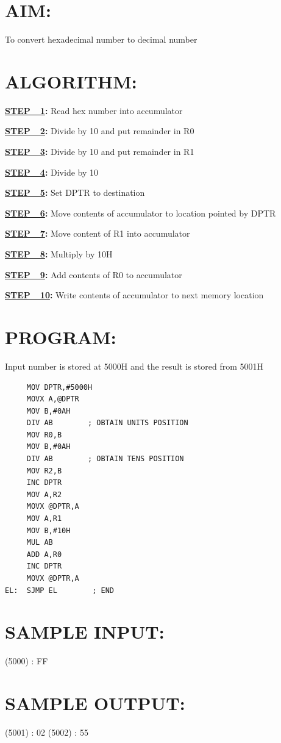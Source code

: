 \documentclass[a4paper,28pt,twoside,openright]{report}
\begin{document}
\section*{AIM:}
To convert hexadecimal number to decimal number

\section*{ALGORITHM:}
\textbf{\underline{STEP\ \ 1}:} Read hex number into accumulator

\textbf{\underline{STEP\ \ 2}:} Divide by 10 and put remainder in R0

\textbf{\underline{STEP\ \ 3}:} Divide by 10 and put remainder in R1

\textbf{\underline{STEP\ \ 4}:} Divide by 10

\textbf{\underline{STEP\ \ 5}:} Set DPTR to destination

\textbf{\underline{STEP\ \ 6}:} Move contents of accumulator to location pointed by DPTR

\textbf{\underline{STEP\ \ 7}:} Move content of R1 into accumulator

\textbf{\underline{STEP\ \ 8}:} Multiply by 10H

\textbf{\underline{STEP\ \ 9}:} Add contents of R0 to accumulator

\textbf{\underline{STEP\ \ 10}:}   Write contents of accumulator to next memory location

\section*{PROGRAM:}
Input number is stored at 5000H and the result is stored from 5001H

\begin{lstlisting}
     MOV DPTR,#5000H
     MOVX A,@DPTR
     MOV B,#0AH
     DIV AB        ; OBTAIN UNITS POSITION
     MOV R0,B
     MOV B,#0AH
     DIV AB        ; OBTAIN TENS POSITION
     MOV R2,B
     INC DPTR
     MOV A,R2
     MOVX @DPTR,A
     MOV A,R1
     MOV B,#10H
     MUL AB
     ADD A,R0
     INC DPTR
     MOVX @DPTR,A
EL:  SJMP EL        ; END
\end{lstlisting}
\section*{SAMPLE INPUT:}
(5000) : FF
\section*{SAMPLE OUTPUT:}
(5001) : 02
(5002) : 55
\end{document}
